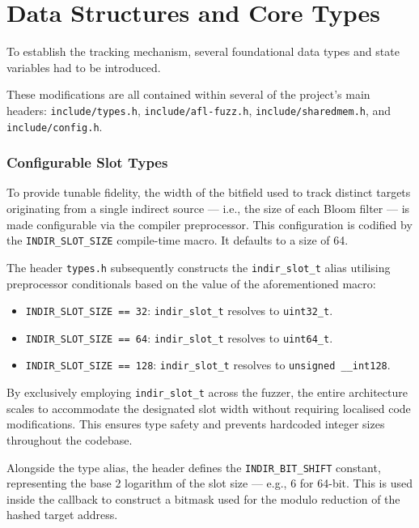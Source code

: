 \section{Data Structures and Core Types}

To establish the tracking mechanism, several foundational data types and state variables had to be introduced.

These modifications are all contained within several of the project's main headers: \texttt{include/types.h}, \texttt{include/afl-fuzz.h}, \texttt{include/sharedmem.h}, and \texttt{include/config.h}.

\subsubsection{Configurable Slot Types}

To provide tunable fidelity, the width of the bitfield used to track distinct targets originating from a single indirect source --- i.e., the size of each Bloom filter --- is made configurable via the compiler preprocessor. This configuration is codified by the \texttt{INDIR\_SLOT\_SIZE} compile-time macro. It defaults to a size of 64.

The header \texttt{types.h} subsequently constructs the \texttt{indir\_slot\_t} alias utilising preprocessor conditionals based on the value of the aforementioned macro:
\begin{itemize}
    \item \texttt{INDIR\_SLOT\_SIZE == 32}: \texttt{indir\_slot\_t} resolves to \texttt{uint32\_t}.
    
    \item \texttt{INDIR\_SLOT\_SIZE == 64}: \texttt{indir\_slot\_t} resolves to \texttt{uint64\_t}.
    
    \item \texttt{INDIR\_SLOT\_SIZE == 128}: \texttt{indir\_slot\_t} resolves to \texttt{unsigned \_\_int128}.
\end{itemize}

By exclusively employing \texttt{indir\_slot\_t} across the fuzzer, the entire architecture scales to accommodate the designated slot width without requiring localised code modifications. This ensures type safety and prevents hardcoded integer sizes throughout the codebase.

Alongside the type alias, the header defines the \texttt{INDIR\_BIT\_SHIFT} constant, representing the base 2 logarithm of the slot size --- e.g., 6 for 64-bit. This is used inside the callback to construct a bitmask used for the modulo reduction of the hashed target address.


